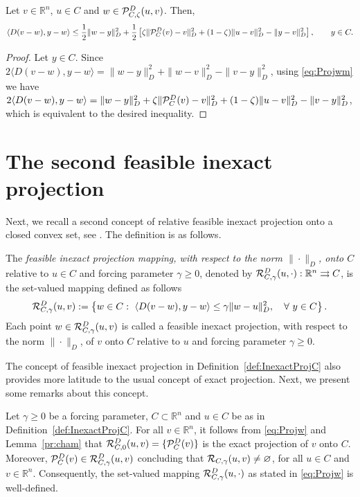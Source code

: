 \begin{lemma} \label{pr:condm}
	Let $v \in {\mathbb R}^n$, $u \in C$ and $w\in {\cal P}_{C,\zeta}^{D}(u, v)$. Then,
	$$
		\left\langle D(v-w), y-w\right\rangle \leq  \frac{1}{2} \|w-y\|_{D}^2 +   \frac{1}{2} \left[\zeta \| {\cal P}_{C}^{D}(v)-v\|_{D}^2+(1-\zeta)\|u-v\|_{D}^2 - \|y-v\|_{D}^2\right] ,   \qquad y \in C.
	$$
\end{lemma}
\begin{proof}
	Let  $y \in C$. Since   $  2\langle D(v-w), y-w\rangle = \|w-y\|_{D}^2 + \|w-v\|_{D}^2-\|v-y\|_{D}^2$,  using \eqref{eq:Projwm}  we have
	$2\langle D(v-w), y-w\rangle = \|w-y\|_{D}^2 + \zeta \| {\cal P}_{C}^{D}(v)-v\|_{D}^2+(1-\zeta)\|u-v\|_{D}^2-\|v-y\|_{D}^2$, which is equivalent to  the desired inequality.
\end{proof}

\section{The second feasible inexact projection}

Next, we recall a second  concept of relative  feasible inexact projection onto a closed convex set, see  \cite{Ademir_Orizon_Leandro2020, OrizonFabianaGilson2018}.  The definition  is as follows.
\begin{definition} \label{def:InexactProjC}
	The {\it feasible inexact projection mapping, with respect to the norm $\| \cdot \|_{D}$,  onto $C$} relative to $u \in C$ and forcing parameter $\gamma\geq 0$, denoted by ${\cal R}_{C,\gamma}^{D}(u, \cdot): {\mathbb R}^n \rightrightarrows C$,  is the set-valued mapping defined as follows
	\begin{equation} \label{eq:Projw}
		{\cal R}_{C,\gamma}^{D}(u, v):= \left\{w\in C:~\left\langle D(v-w), y-w \right\rangle \leq \gamma \|w-u\|_{D}^2, \quad \forall~ y \in C \right\}.
	\end{equation}
	Each point $w\in {\cal R}_{C,\gamma}^{D}(u, v)$ is called a feasible inexact projection,  with respect to the norm $\| \cdot \|_{D}$,  of $v$ onto $C$ relative to $u$ and forcing parameter $\gamma\geq 0$.
\end{definition}
The concept of  feasible inexact projection  in Definition~\ref{def:InexactProjC} also  provides  more latitude to  the usual concept  of exact projection. Next,  we present some remarks about this concept.
\begin{remark}\normalfont\label{rem: welldef}
	Let $\gamma\geq 0$ be a forcing parameter, $C\subset {\mathbb R}^n$ and $u\in C$ be as in Definition~\ref{def:InexactProjC}.
	For all $v\in {\mathbb R}^n$, it follows from \eqref{eq:Projw} and Lemma~\ref{pr:cham} that ${\cal R}_{C,0}^{D}(u, v)=\{{\cal P}_{C}^{D}(v)\}$ is the exact projection of $v$ onto $C$. Moreover, ${\cal P}_{C}^{D}(v)\in {\cal R}_{C,\gamma}^{D}(u, v)$ concluding  that ${\cal R}_{C, \gamma}(u, v)\neq \varnothing$, for all $u\in C$ and $v\in {\mathbb R}^n$. Consequently, the set-valued mapping ${\cal R}_{C,\gamma}^{D}(u, \cdot)$ as stated in \eqref{eq:Projw} is well-defined.
\end{remark}\normalfont

